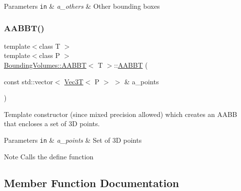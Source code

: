 \begin{DoxyParams}[1]{Parameters}
\mbox{\tt in}  & {\em a\+\_\+others} & Other bounding boxes \\
\hline
\end{DoxyParams}
\mbox{\label{classBoundingVolumes_1_1AABBT_ab58be0cf4a32b502fdd1aedb7ba11587}} 
\subsubsection{\texorpdfstring{A\+A\+B\+B\+T()}{AABBT()}\hspace{0.1cm}{\footnotesize\ttfamily [4/4]}}
{\footnotesize\ttfamily template$<$class T $>$ \\
template$<$class P $>$ \\
\hyperlink{classBoundingVolumes_1_1AABBT}{Bounding\+Volumes\+::\+A\+A\+B\+BT}$<$ T $>$\+::\hyperlink{classBoundingVolumes_1_1AABBT}{A\+A\+B\+BT} (\begin{DoxyParamCaption}\item[{const std\+::vector$<$ \hyperlink{classVec3T}{Vec3T}$<$ P $>$ $>$ \&}]{a\+\_\+points }\end{DoxyParamCaption})}



Template constructor (since mixed precision allowed) which creates an A\+A\+BB that encloses a set of 3D points. 


\begin{DoxyParams}[1]{Parameters}
\mbox{\tt in}  & {\em a\+\_\+points} & Set of 3D points \\
\hline
\end{DoxyParams}
\begin{DoxyNote}{Note}
Calls the define function 
\end{DoxyNote}


\subsection{Member Function Documentation}
\mbox{\label{classBoundingVolumes_1_1AABBT_a5ff57720a5d6511642ce39a09a7b7663}} 
